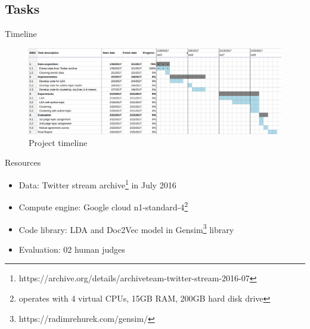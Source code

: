 \documentclass{beamer}
\begin{document}
\subsection{Tasks}
\begin{frame}{Timeline}
	\begin{figure}
		\centering
		\includegraphics[width=\textwidth]{project_timeline}
		\caption{Project timeline}
		\label{fig:project_timeline}
	\end{figure}
\end{frame}

\begin{frame}{Resources}
\begin{itemize}
	\item Data: Twitter stream archive\footnote[frame]{https://archive.org/details/archiveteam-twitter-stream-2016-07} in July 2016
	\item Compute engine: Google cloud n1-standard-4\footnote[frame]{operates with 4 virtual CPUs, 15GB RAM, 200GB hard disk drive}
	\item Code library: LDA and Doc2Vec model in Gensim\footnote[frame]{https://radimrehurek.com/gensim/} library
	\item Evaluation: 02 human judges
\end{itemize}
\end{frame}
\end{document}
